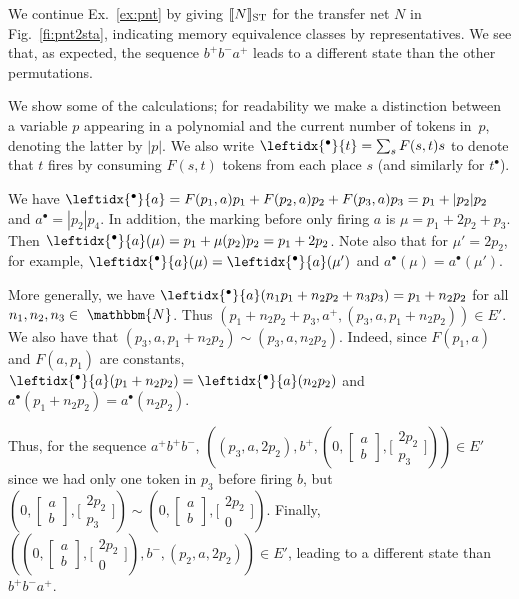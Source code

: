 \documentclass[runningheads,envcountsame]{llncs}
\newcommand*\Nat{\mathbbm{N}}
\newcommand*\loset[1]{\left[\begin{smallmatrix}#1\end{smallmatrix}\right]}
\newcommand*\sloset[1]{\big[\begin{smallmatrix}#1\end{smallmatrix}\big]}
\newcommand*\prepla[1]{\leftidx{^\bullet}{#1}}
\newcommand*\pospla[1]{#1^\bullet}
\newcommand*\sem[1]{\llbracket #1\rrbracket}
\newcommand*\ST{\textup{ST}}
\newcommand*\nbtokp[1]{|#1|}
\begin{document}
\begin{example}
  \label{ex:pnt2sta}
  We continue Ex.~\ref{ex:pnt} by giving $\sem{N}_\ST$ for the transfer net $N$ in Fig.~\ref{fi:pnt2sta},
  indicating memory equivalence classes by representatives.
  We see that, as expected, the sequence $b^+ b^- a^+$ leads to a different state than the other permutations.

  We show some of the calculations; for readability we make a distinction between a variable $p$ appearing in a polynomial
  and the current number of tokens in~$p$, denoting the latter by $\nbtokp{p}$.
  We also write $\prepla t = \sum_s F(s,t) s$ to denote that $t$ fires by consuming $F(s,t)$ tokens from each place $s$ (and similarly for $\pospla t$).

  We have $\prepla{a} = F(p_1,a) p_1 + F(p_2,a) p_2 + F(p_3,a)p_3 = p_1 + \nbtokp{p_2} p_2$ and $\pospla{a} = \nbtokp{p_2} p_4$.
  In addition, the marking before only firing $a$ is $\mu = p_1 + 2p_2 + p_3$.
  Then $\prepla{a}(\mu) = p_1 + \mu(p_2)p_2 = p_1 + 2p_2$.
  Note also that for $\mu' = 2p_2$, for example, $\prepla{a}(\mu) = \prepla{a}(\mu')$ and $\pospla{a}(\mu) = \pospla{a}(\mu')$.
  
  More generally, we have $\prepla{a}(n_1p_1 + n_2p_2 + n_3p_3) = p_1 + n_2 p_2$ for all $n_1,n_2,n_3 \in~\Nat$.
  Thus  $(p_1 + n_2 p_2 + p_3, a^+, (p_3, a, p_1 + n_2 p_2)) \in E'$.
  We also have that $(p_3, a, p_1 + n_2 p_2) \sim (p_3, a, n_2 p_2)$.
  Indeed, since $F(p_1,a)$ and $F(a, p_1)$ are constants, $\prepla{a}(p_1 + n_2 p_2) = \prepla{a}(n_2p_2)$ and $\pospla{a}(p_1 + n_2 p_2) = \pospla{a}(n_2p_2)$.
  
 Thus, for the sequence $a^+ b^+ b^-$, $((p_3, a, 2 p_2), b^+, (0, \loset{a \\ b}, \sloset{2p_2 \\ p_3})) \in E'$ since we had only one token in $p_3$ before firing $b$, but $(0, \loset{a \\ b}, \sloset{2p_2 \\ p_3}) \sim (0, \loset{a \\ b}, \sloset{2p_2 \\ 0})$.
  Finally, $((0, \loset{a \\ b}, \sloset{2p_2 \\ 0}),b^-, (p_2, a, 2p_2)) \in E'$, leading to a different state than $b^+ b^- a^+$.
\end{example}
\end{document}
